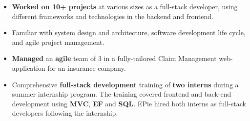 \documentclass[10pt,a4paper,ragged2e,withhyper]{files/altacv}
\begin{document}
\begin{paracol}{2}
\divider

\begin{itemize}

\item \textbf{Worked on 10+ projects} at various sizes as a full-stack developer, using different frameworks and technologies in the backend and frontend. 

\item Familiar with system design and architecture, software development life cycle, and agile project management. 

\item \textbf{Managed} an \textbf{agile} team of 3 in a fully-tailored Claim Management web-application for an insurance company.

\item Comprehensive \textbf{full-stack development} training of \textbf{two interns} during a summer internship program. The training covered frontend and back-end development using \textbf{MVC}, \textbf{EF} and \textbf{SQL}. EPie hired both interns as full-stack developers following the internship.
\end{itemize}










\iffalse
{}
\hspace*{-1em}  %


\end{paracol}
\end{document}
